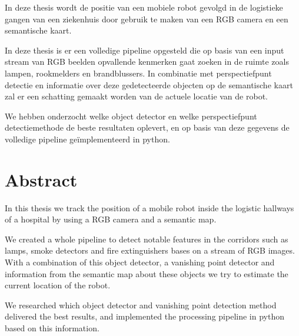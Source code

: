 In deze thesis wordt de positie van een mobiele robot gevolgd in de logistieke gangen van een ziekenhuis door gebruik te maken van een RGB camera en een semantische kaart.

In deze thesis is er een volledige pipeline opgesteld die op basis van een input stream van RGB beelden opvallende kenmerken
gaat zoeken in de ruimte zoals lampen, rookmelders en brandblussers.
In combinatie met perspectiefpunt detectie en informatie over deze gedetecteerde objecten op de semantische kaart zal er een
schatting gemaakt worden van de actuele locatie van de robot.

We hebben onderzocht welke object detector en welke perspectiefpunt detectiemethode de beste resultaten oplevert, en op basis van
deze gegevens de volledige pipeline ge\"{i}mplementeerd in python.


\pagebreak
\chapter*{Abstract}

In this thesis we track the position of a mobile robot inside the logistic hallways of a hospital by using a RGB camera and a semantic map.

We created a whole pipeline to detect notable features in the corridors such as lamps, smoke detectors and fire extinguishers bases on a stream of RGB images.
With a combination of this object detector, a vanishing point detector and information from the semantic map about these objects we try to estimate
the current location of the robot.

We researched which object detector and vanishing point detection method delivered the best results, and implemented the processing pipeline
in python based on this information.